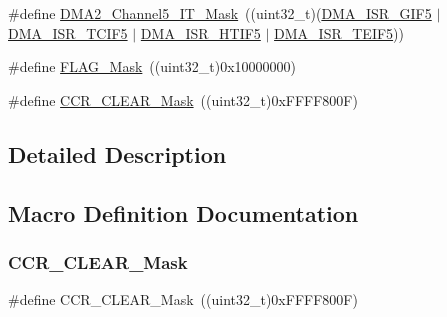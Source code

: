 \begin{DoxyCompactItemize}
\item 
\#define \hyperlink{group___d_m_a___private___defines_gaedaf3e94d362754266807d6ccbab2e3e}{D\+M\+A2\+\_\+\+Channel5\+\_\+\+I\+T\+\_\+\+Mask}~((uint32\+\_\+t)(\hyperlink{group___peripheral___registers___bits___definition_ga83d4d9cba635d1e33e3477b773379cfd}{D\+M\+A\+\_\+\+I\+S\+R\+\_\+\+G\+I\+F5} $\vert$ \hyperlink{group___peripheral___registers___bits___definition_ga5ea57d09f13edbd6ad8afe9465e0fa70}{D\+M\+A\+\_\+\+I\+S\+R\+\_\+\+T\+C\+I\+F5} $\vert$ \hyperlink{group___peripheral___registers___bits___definition_ga3d1f2b8c82b1e20b4311af8ca9576736}{D\+M\+A\+\_\+\+I\+S\+R\+\_\+\+H\+T\+I\+F5} $\vert$ \hyperlink{group___peripheral___registers___bits___definition_ga42f9b12c4c80cbb7cd0f94f139c73de3}{D\+M\+A\+\_\+\+I\+S\+R\+\_\+\+T\+E\+I\+F5}))
\item 
\#define \hyperlink{group___d_m_a___private___defines_ga2be62bf481cd44de9ab604efe5595ff6}{F\+L\+A\+G\+\_\+\+Mask}~((uint32\+\_\+t)0x10000000)
\item 
\#define \hyperlink{group___d_m_a___private___defines_gac2c71cc75907c7c3467907e766dc4188}{C\+C\+R\+\_\+\+C\+L\+E\+A\+R\+\_\+\+Mask}~((uint32\+\_\+t)0x\+F\+F\+F\+F800\+F)
\end{DoxyCompactItemize}


\subsection{Detailed Description}


\subsection{Macro Definition Documentation}
\mbox{\label{group___d_m_a___private___defines_gac2c71cc75907c7c3467907e766dc4188}} 
\subsubsection{\texorpdfstring{C\+C\+R\+\_\+\+C\+L\+E\+A\+R\+\_\+\+Mask}{CCR\_CLEAR\_Mask}}
{\footnotesize\ttfamily \#define C\+C\+R\+\_\+\+C\+L\+E\+A\+R\+\_\+\+Mask~((uint32\+\_\+t)0x\+F\+F\+F\+F800\+F)}



